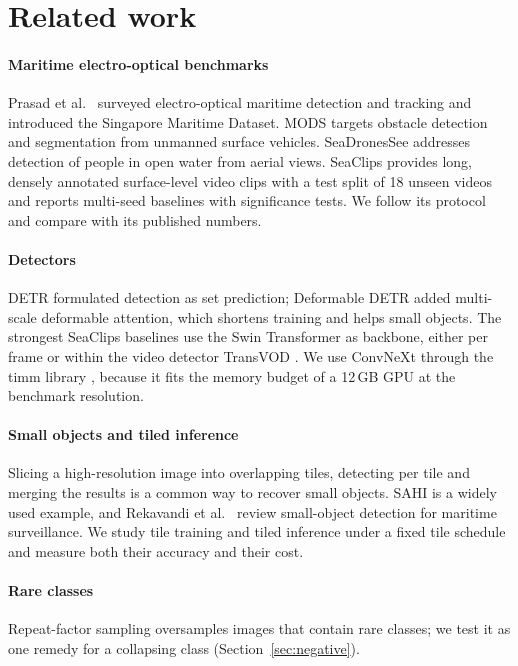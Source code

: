 \section{Related work}\label{sec:related}

\paragraph{Maritime electro-optical benchmarks}
Prasad et al.\ \citep{prasad2017smd} surveyed electro-optical maritime detection and tracking and introduced the Singapore Maritime Dataset. MODS \citep{bovcon2022mods} targets obstacle detection and segmentation from unmanned surface vehicles. SeaDronesSee \citep{varga2022seadronessee} addresses detection of people in open water from aerial views. SeaClips \citep{denk2026seaclips} provides long, densely annotated surface-level video clips with a test split of 18 unseen videos and reports multi-seed baselines with significance tests. We follow its protocol and compare with its published numbers.

\paragraph{Detectors}
DETR \citep{carion2020detr} formulated detection as set prediction; Deformable DETR \citep{zhu2021deformable} added multi-scale deformable attention, which shortens training and helps small objects. The strongest SeaClips baselines use the Swin Transformer \citep{liu2021swin} as backbone, either per frame or within the video detector TransVOD \citep{zhou2023transvod}. We use ConvNeXt \citep{liu2022convnext} through the timm library \citep{wightman2019timm}, because it fits the memory budget of a 12\,GB GPU at the benchmark resolution.

\paragraph{Small objects and tiled inference}
Slicing a high-resolution image into overlapping tiles, detecting per tile and merging the results is a common way to recover small objects. SAHI \citep{akyon2022sahi} is a widely used example, and Rekavandi et al.\ \citep{rekavandi2022guide} review small-object detection for maritime surveillance. We study tile training and tiled inference under a fixed tile schedule and measure both their accuracy and their cost.

\paragraph{Rare classes}
Repeat-factor sampling \citep{gupta2019lvis} oversamples images that contain rare classes; we test it as one remedy for a collapsing class (Section~\ref{sec:negative}).

